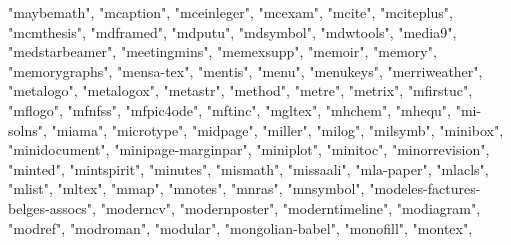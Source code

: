 \documentclass[
]{article}
\newenvironment{Shaded}{\begin{snugshade}}{\end{snugshade}}
\newcommand{\NormalTok}[1]{#1}
\newcommand{\StringTok}[1]{\textcolor[rgb]{0.31,0.60,0.02}{#1}}
\begin{document}
\begin{Shaded}
\begin{Highlighting}[]
\StringTok{"maybemath"}\NormalTok{, }\StringTok{"mcaption"}\NormalTok{, }\StringTok{"mceinleger"}\NormalTok{, }\StringTok{"mcexam"}\NormalTok{, }\StringTok{"mcite"}\NormalTok{, }\StringTok{"mciteplus"}\NormalTok{, }
\StringTok{"mcmthesis"}\NormalTok{, }\StringTok{"mdframed"}\NormalTok{, }\StringTok{"mdputu"}\NormalTok{, }\StringTok{"mdsymbol"}\NormalTok{, }\StringTok{"mdwtools"}\NormalTok{, }\StringTok{"media9"}\NormalTok{, }
\StringTok{"medstarbeamer"}\NormalTok{, }\StringTok{"meetingmins"}\NormalTok{, }\StringTok{"memexsupp"}\NormalTok{, }\StringTok{"memoir"}\NormalTok{, }\StringTok{"memory"}\NormalTok{, }
\StringTok{"memorygraphs"}\NormalTok{, }\StringTok{"mensa{-}tex"}\NormalTok{, }\StringTok{"mentis"}\NormalTok{, }\StringTok{"menu"}\NormalTok{, }\StringTok{"menukeys"}\NormalTok{, }\StringTok{"merriweather"}\NormalTok{, }
\StringTok{"metalogo"}\NormalTok{, }\StringTok{"metalogox"}\NormalTok{, }\StringTok{"metastr"}\NormalTok{, }\StringTok{"method"}\NormalTok{, }\StringTok{"metre"}\NormalTok{, }\StringTok{"metrix"}\NormalTok{, }
\StringTok{"mfirstuc"}\NormalTok{, }\StringTok{"mflogo"}\NormalTok{, }\StringTok{"mfnfss"}\NormalTok{, }\StringTok{"mfpic4ode"}\NormalTok{, }\StringTok{"mftinc"}\NormalTok{, }\StringTok{"mgltex"}\NormalTok{, }
\StringTok{"mhchem"}\NormalTok{, }\StringTok{"mhequ"}\NormalTok{, }\StringTok{"mi{-}solns"}\NormalTok{, }\StringTok{"miama"}\NormalTok{, }\StringTok{"microtype"}\NormalTok{, }\StringTok{"midpage"}\NormalTok{, }
\StringTok{"miller"}\NormalTok{, }\StringTok{"milog"}\NormalTok{, }\StringTok{"milsymb"}\NormalTok{, }\StringTok{"minibox"}\NormalTok{, }\StringTok{"minidocument"}\NormalTok{, }\StringTok{"minipage{-}marginpar"}\NormalTok{, }
\StringTok{"miniplot"}\NormalTok{, }\StringTok{"minitoc"}\NormalTok{, }\StringTok{"minorrevision"}\NormalTok{, }\StringTok{"minted"}\NormalTok{, }\StringTok{"mintspirit"}\NormalTok{, }
\StringTok{"minutes"}\NormalTok{, }\StringTok{"mismath"}\NormalTok{, }\StringTok{"missaali"}\NormalTok{, }\StringTok{"mla{-}paper"}\NormalTok{, }\StringTok{"mlacls"}\NormalTok{, }\StringTok{"mlist"}\NormalTok{, }
\StringTok{"mltex"}\NormalTok{, }\StringTok{"mmap"}\NormalTok{, }\StringTok{"mnotes"}\NormalTok{, }\StringTok{"mnras"}\NormalTok{, }\StringTok{"mnsymbol"}\NormalTok{, }\StringTok{"modeles{-}factures{-}belges{-}assocs"}\NormalTok{, }
\StringTok{"moderncv"}\NormalTok{, }\StringTok{"modernposter"}\NormalTok{, }\StringTok{"moderntimeline"}\NormalTok{, }\StringTok{"modiagram"}\NormalTok{, }\StringTok{"modref"}\NormalTok{, }
\StringTok{"modroman"}\NormalTok{, }\StringTok{"modular"}\NormalTok{, }\StringTok{"mongolian{-}babel"}\NormalTok{, }\StringTok{"monofill"}\NormalTok{, }\StringTok{"montex"}\NormalTok{, }

\end{Highlighting}
\end{Shaded}
\end{document}
